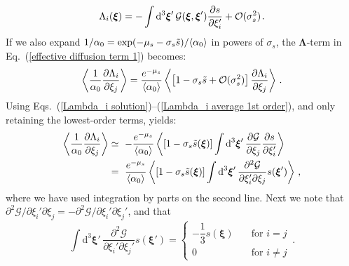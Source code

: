 \documentclass[fleqn,usenatbib]{mnras}
\begin{document}
\begin{equation}
    \Lambda_{i}(\boldsymbol{\xi}) = -\int \textrm{d}^3 \boldsymbol{\xi}' \, \mathcal{G}(\boldsymbol{\xi},\boldsymbol{\xi}') \dfrac{\partial s}{\partial \xi_{i}'} + \mathcal{O}(\sigma_s^2) \hspace{1 pt} . \label{Lambda_i solution}
\end{equation}
If we also expand $1/\alpha_0 = \exp(-\mu_s-\sigma_s \Tilde{s})/\langle \alpha_0 \rangle$ in powers of $\sigma_s$, the $\boldsymbol{\Lambda}$-term in Eq.~(\ref{effective diffusion term 1}) becomes:
\begin{equation}
    \left\langle \dfrac{1}{\alpha_0}  \dfrac{\partial \Lambda_i}{\partial \xi_j}   \right\rangle = \dfrac{e^{-\mu_s}}{\langle \alpha_0 \rangle} \left\langle \left[1 - \sigma_s \Tilde{s} + \mathcal{O}(\sigma_s^2) \right]  \dfrac{\partial \Lambda_i}{\partial \xi_j}   \right\rangle  \, \label{Lambda_i average 1st order}.
\end{equation}
Using Eqs.~(\ref{Lambda_i solution})--(\ref{Lambda_i average 1st order}), and only retaining the lowest-order terms, yields:
\begin{align}
    \left\langle \dfrac{1}{\alpha_0}  \dfrac{\partial \Lambda_i}{\partial \xi_j}   \right\rangle &\simeq~   -\dfrac{e^{-\mu_s}}{\langle \alpha_0 \rangle} \left\langle [1- \sigma_s\Tilde{s}(\boldsymbol{\xi})]   \int \textrm{d}^3 \boldsymbol{\xi}' \,  \dfrac{\partial \mathcal{G}}{\partial \xi_j}  \dfrac{\partial s}{\partial \xi_{i}'}   \right\rangle  \nonumber \\ &=~ \dfrac{e^{-\mu_s}}{\langle \alpha_0 \rangle}     \left\langle [1- \sigma_s\Tilde{s}(\boldsymbol{\xi})] \int \textrm{d}^3 \boldsymbol{\xi}' \,  \dfrac{\partial^2 \mathcal{G}}{\partial \xi_i' \partial \xi_j }     s(\boldsymbol{\xi}') \right\rangle \, \nonumber ,
\end{align}
where we have used integration by parts on the second line. Next we note that $\partial^2 \mathcal{G}/\partial \xi_i' \partial \xi_j = -\partial^2 \mathcal{G}/\partial \xi_i' \partial \xi_j'$, and that
\begin{equation}
    \int \textrm{d}^3 \boldsymbol{\xi}' \,  \dfrac{\partial^2 \mathcal{G}}{\partial \xi_i' \partial \xi_j' }  s(\boldsymbol{\xi}') = \begin{cases}
        -\dfrac{1}{3} s(\boldsymbol{\xi}) & \quad \textrm{for } i=j \\ 0 & \quad \textrm{for }  i \neq j
    \end{cases} \, .
\end{equation}
\end{document}
